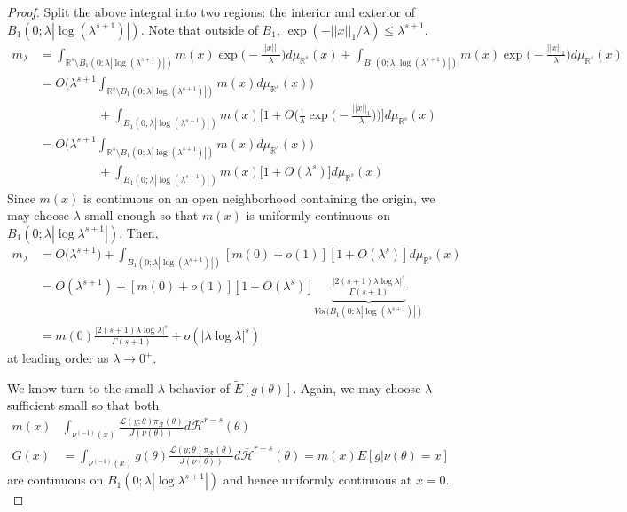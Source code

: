 \documentclass[10pt,fleqn]{article}
\DeclareMathOperator{\1}{\mathbbm{1}}
\begin{document}
\begin{proof}
Split the above integral into two regions: the interior and exterior of $B_1(0;\lambda|\log(\lambda^{s+1})|)$. Note that outside of $B_1$, $\exp(-||x||_1/\lambda) \le \lambda^{s+1}.$
\begin{align*}
m_\lambda &= \int_{\mathbb{R}^s \setminus B_1(0;\lambda|\log(\lambda^{s+1})|)}m(x) \exp\bigg(-\frac{||x||_1}{\lambda}\bigg)d\mu_{\mathbb{R}^s}(x) + \int_{B_1(0;\lambda|\log(\lambda^{s+1})|)}m(x) \exp\bigg(-\frac{||x||_1}{\lambda}\bigg)d\mu_{\mathbb{R}^s}(x) \\
&=O\bigg( \lambda^{s+1} \int_{\mathbb{R}^s \setminus B_1(0;\lambda|\log(\lambda^{s+1})|)}m(x) d\mu_{\mathbb{R}^s}(x)\bigg) \\
&\hspace{2cm}+ \int_{B_1(0;\lambda|\log(\lambda^{s+1})|)} m(x) \bigg[1+O\bigg(\frac{1}{\lambda}\exp\bigg(-\frac{||x||_1}{\lambda}\bigg)\bigg)\bigg]d\mu_{\mathbb{R}^s}(x) \\
&=O\bigg( \lambda^{s+1} \int_{\mathbb{R}^s \setminus B_1(0;\lambda|\log(\lambda^{s+1})|)}m(x) d\mu_{\mathbb{R}^s}(x)\bigg) \\
&\hspace{2cm}+ \int_{B_1(0;\lambda|\log(\lambda^{s+1})|)} m(x) \bigg[1+O(\lambda^s) \bigg]d\mu_{\mathbb{R}^s}(x)
\end{align*}
Since $m(x)$ is continuous on an open neighborhood containing the origin, we may choose $\lambda$ small enough so that $m(x)$ is uniformly continuous on $B_1(0;\lambda |\log \lambda^{s+1}|).$ Then, 
\begin{align*}
m_\lambda&= O\bigg( \lambda^{s+1} \bigg) + \int_{B_1(0;\lambda|\log(\lambda^{s+1})|)} [m(0) + o(1)][1+O(\lambda^s)] d\mu_{\mathbb{R}^s} (x) \\
&= O(\lambda^{s+1}) + [m(0)+o(1)][1+ O(\lambda^s)] \underbrace{\frac{|2(s+1)\lambda \log \lambda |^s}{\Gamma(s+1)}}_{Vol(B_1(0;\lambda|\log(\lambda^{s+1})|)}   \\
&= m(0) \frac{|2(s+1)\lambda \log \lambda |^s}{\Gamma(s+1)} + o(|\lambda \log \lambda|^s) 
\end{align*}
at leading order as $\lambda\to 0^+$.


We know turn to the small $\lambda$ behavior of $\tilde{E}[g(\theta)].$  Again, we may choose $\lambda$ sufficient small so that both
\begin{align*}
m(x)& \int_{\nu^{(-1)}(x)} \frac{\mathcal{L}(y;\theta)\pi_\mathcal{R}(\theta)}{J(\nu(\theta))} d\bar{\mathcal{H}}^{r-s}(\theta)   \\
G(x)&= \int_{\nu^{(-1)}(x)} g(\theta) \frac{\mathcal{L}(y;\theta)\pi_\mathcal{R}(\theta)}{J(\nu(\theta))} d\bar{\mathcal{H}}^{r-s}(\theta) =m(x)E[g|\nu(\theta)=x]
\end{align*}
are continuous on $B_1(0;\lambda|\log \lambda^{s+1}|)$ and hence uniformly continuous at $x=0.$ 


\end{proof}
\end{document}
